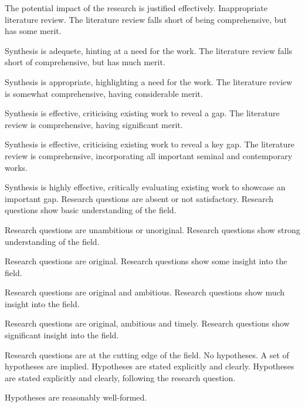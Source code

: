 \begin{markingrubric}
        	\par The potential impact of the research is justified effectively.
%  		
        \grade \fail Inappropriate literature review.
        \grade The literature review falls short of being comprehensive, but has some merit.
        	\par  Synthesis is adequete, hinting at a need for the work.
        \grade The literature review falls short of comprehensive, but has much merit.
        	\par  Synthesis is appropriate, highlighting a need for the work.
        \grade The literature review is somewhat comprehensive, having considerable merit.
        	\par  Synthesis is effective, criticising existing work to reveal a gap.
        \grade The literature review is comprehensive, having significant merit.
        	\par Synthesis is effective, criticising existing work to reveal a key gap.
        \grade The literature review is comprehensive, incorporating all important seminal and contemporary works.
        	\par Synthesis is highly effective, critically evaluating existing work to showcase an important gap.
%
        \grade\fail 	Research questions are absent or not satisfactory.
        \grade 		Research questions show basic understanding of the field.
        \par		Research questions are unambitious or unoriginal.
        \grade 		Research questions show strong understanding of the field.
        \par		Research questions are original.
        \grade 		Research questions show some insight into the field.
        \par		Research questions are original and ambitious.
        \grade 		Research questions show much insight into the field.
        \par		Research questions are original, ambitious and timely.
        \grade 		Research questions show significant insight into the field.
        \par		Research questions are at the cutting edge of the field.
%        
            \grade\fail   No hypotheses.
        \grade 		A set of hypotheses are implied.
        \grade 		Hypotheses are stated explicitly and clearly.
        \grade 		Hypotheses are stated explicitly and clearly, following the research question.
        \par		Hypotheses are reasonably well-formed.

\end{markingrubric}
